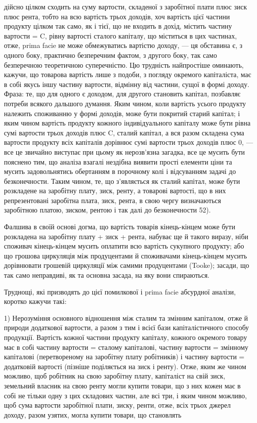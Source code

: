 дійсно цілком сходить на суму вартости, складеної з заробітної плати плюс
зиск плюс рента, тобто на всю вартість трьох доходів, хоч вартість цієї частини
продукту цілком так само, як і тієї, що не входить в дохід, містить частину
вартости = C, рівну вартості сталого капіталу, що міститься в цих частинах,
отже, prima facie не може обмежуватись вартістю доходу, — ця обставина є, з одного
боку, практично безперечним фактом, з другого боку, так само безперечною
теоретичною суперечністю. Цю трудність найпростіше оминають, кажучи, що
товарова вартість лише з подоби, з погляду окремого капіталіста, має в собі
якусь іншу частину вартости, відмінну від частини, сущої в формі доходу.
Фраза: те, що для одного є доходом, для другого становить капітал, позбавляє
потреби всякого дальшого думання. Яким чином, коли вартість усього продукту
належить споживанню у формі доходів, може бути покритий старий капітал; і
яким чином вартість продукту кожного індивідуального капіталу може бути
рівна сумі вартости трьох доходів плюс C, сталий капітал, а вся разом складена
сума вартости продукту всіх капіталів дорівнює сумі вартости трьох доходів
плюс 0, — все це звичайно виступає при цьому як нерозв’язна загадка, все це
мусить бути пояснено тим, що аналіза взагалі нездібна виявити прості елементи
ціни та мусить задовольнятись обертанням в порочному колі і відсуванням
задачі до безконечности. Таким чином, те, що з’являється як сталий капітал,
може бути розкладене на заробітну плату, зиск, ренту, а товарові вартості,
що в них репрезентовані заробітна плата, зиск, рента, в свою чергу визначаються
заробітною платою, зиском, рентою і так далі до безконечности 52).

Фалшива в своїй основі догма, що вартість товарів кінець-кінцем може
бути розкладена на заробітну плату + зиск + рента, набуває ще й такого виразу,
ніби споживач кінець-кінцем мусить оплатити всю вартість сукупного
продукту; або що грошова циркуляція між продуцентами й споживачами кінець-кінцем
мусить дорівнювати грошевій циркуляції між самими продуцентами
(Tooke); засади, що так само неправдиві, як та основна засада, на яку вони
спираються.

Труднощі, які призводять до цієї помилкової і prima facie абсурдної аналізи,
коротко кажучи такі:

1) Нерозуміння основного відношення між сталим та змінним капіталом,
отже й природи додаткової вартости, а разом з тим і всієї бази капіталістичного
способу продукції. Вартість кожної частини продукту капіталу, кожного
окремого товару має в собі частину вартости = сталому капіталові, частину
вартости = змінному капіталові (перетвореному на заробітну плату робітників)
і частину вартости = додатковій вартості (пізніше поділяється на зиск і ренту).
Отже, яким же чином можливо, щоб робітник на свою заробітну плату, капіталіст
на свій зиск, земельний власник на свою ренту могли купити товари, що
з них кожен має в собі не тільки одну з цих складових частин, але всі три, і
яким чином можливо, щоб сума вартости заробітної плати, зиску, ренти, отже,
всіх трьох джерел доходу, разом узятих, могла купити товари, що становлять

